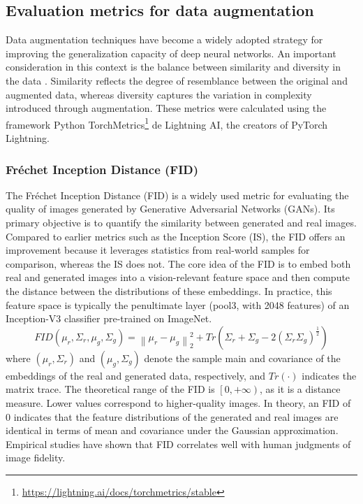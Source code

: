 \documentclass[journal]{IEEEtran}
\begin{document}
\subsection{Evaluation metrics for data augmentation}
Data augmentation techniques have become a widely adopted strategy for improving the generalization capacity of deep neural networks. An important consideration in this context is the balance between similarity and diversity in the data \cite{yang2024investigating}. Similarity reflects the degree of resemblance between the original and augmented data, whereas diversity captures the variation in complexity introduced through augmentation. 
These metrics were calculated using the framework Python TorchMetrics\footnote{\href{https://lightning.ai/docs/torchmetrics/stable}{\color{blue}https://lightning.ai/docs/torchmetrics/stable}} de Lightning AI, the creators of PyTorch Lightning.


\subsubsection{Fréchet Inception Distance (FID)}
The Fréchet Inception Distance (FID) is a widely used metric for evaluating the quality of images generated by Generative Adversarial Networks (GANs)\cite{guven2024image}. Its primary objective is to quantify the similarity between generated and real images\cite{heusel2017gans}. Compared to earlier metrics such as the Inception Score (IS), the FID offers an improvement because it leverages statistics from real-world samples for comparison, whereas the IS does not\cite{kynkäänniemi2023roleimagenetclassesfrechet}.
The core idea of the FID is to embed both real and generated images into a vision-relevant feature space and then compute the distance between the distributions of these embeddings. In practice, this feature space is typically the penultimate layer (pool3, with 2048 features) of an Inception-V3 classifier pre-trained on ImageNet\cite{kynkäänniemi2023roleimagenetclassesfrechet}.
\begin{equation}
FID(\mu_r,\Sigma_r,\mu_g,\Sigma_g )=\left\|\mu_r-\mu_g \right\|_2^2+Tr(\Sigma_r+\Sigma_g-2(\Sigma_r \Sigma_g)^{\frac{1}{2}})
\end{equation}
where $(\mu_r,\Sigma_r)$ and $(\mu_g,\Sigma_g)$ denote the sample main and covariance of the embeddings of the real and generated data, respectively, and $Tr(\cdot)$ indicates the matrix trace\cite{kynkäänniemi2023roleimagenetclassesfrechet}.
The theoretical range of the FID is $\left[0, +\infty\right)$, as it is a distance measure. Lower values correspond to higher-quality images\cite{wang2019improvingmmdgantrainingrepulsive}. In theory, an FID of 0 indicates that the feature distributions of the generated and real images are identical in terms of mean and covariance under the Gaussian approximation\cite{heusel2017gans}.
Empirical studies have shown that FID correlates well with human judgments of image fidelity\cite{heusel2017gans}. 
\end{document}
